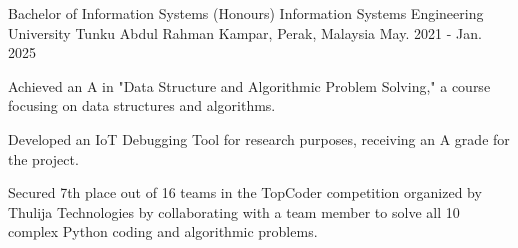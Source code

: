 

\begin{cventries}

  \cventry
    {Bachelor of Information Systems (Honours) Information Systems Engineering} %
    {University Tunku Abdul Rahman} %
    {Kampar, Perak, Malaysia} %
    {May. 2021 - Jan. 2025} %
    {
      \begin{cvitems} %
        \item {Achieved an A in "Data Structure and Algorithmic Problem Solving," a course focusing on data structures and algorithms.}
        \item {Developed an IoT Debugging Tool for research purposes, receiving an A grade for the project.}
        \item {Secured 7th place out of 16 teams in the TopCoder competition organized by Thulija Technologies by collaborating with a team member to solve all 10 complex Python coding and algorithmic problems.}
      \end{cvitems}
    }
\end{cventries}
